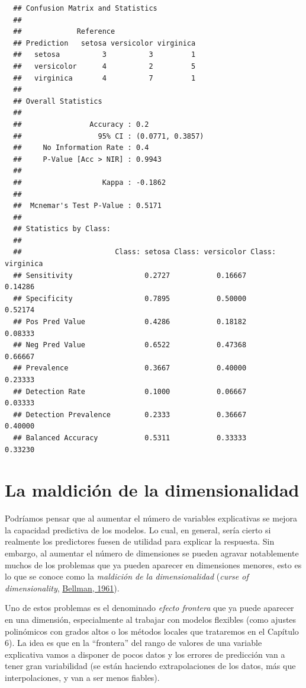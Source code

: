 \documentclass[
]{book}
\theoremstyle{break}
\theoremstyle{nonumberplain}
\begin{document}
\begin{verbatim}
  ## Confusion Matrix and Statistics
  ## 
  ##             Reference
  ## Prediction   setosa versicolor virginica
  ##   setosa          3          3         1
  ##   versicolor      4          2         5
  ##   virginica       4          7         1
  ## 
  ## Overall Statistics
  ##                                           
  ##                Accuracy : 0.2             
  ##                  95% CI : (0.0771, 0.3857)
  ##     No Information Rate : 0.4             
  ##     P-Value [Acc > NIR] : 0.9943          
  ##                                           
  ##                   Kappa : -0.1862         
  ##                                           
  ##  Mcnemar's Test P-Value : 0.5171          
  ## 
  ## Statistics by Class:
  ## 
  ##                      Class: setosa Class: versicolor Class: virginica
  ## Sensitivity                 0.2727           0.16667          0.14286
  ## Specificity                 0.7895           0.50000          0.52174
  ## Pos Pred Value              0.4286           0.18182          0.08333
  ## Neg Pred Value              0.6522           0.47368          0.66667
  ## Prevalence                  0.3667           0.40000          0.23333
  ## Detection Rate              0.1000           0.06667          0.03333
  ## Detection Prevalence        0.2333           0.36667          0.40000
  ## Balanced Accuracy           0.5311           0.33333          0.33230
\end{verbatim}

\hypertarget{dimen-curse}{%
\section{La maldición de la dimensionalidad}\label{dimen-curse}}

Podríamos pensar que al aumentar el número de variables explicativas se mejora la capacidad predictiva de los modelos.
Lo cual, en general, sería cierto si realmente los predictores fuesen de utilidad para explicar la respuesta.
Sin embargo, al aumentar el número de dimensiones se pueden agravar notablemente muchos de los problemas que ya pueden aparecer en dimensiones menores, esto es lo que se conoce como la \emph{maldición de la dimensionalidad} (\emph{curse of dimensionality}, \protect\hyperlink{ref-bellman1961adaptive}{Bellman, 1961}).

Uno de estos problemas es el denominado \emph{efecto frontera} que ya puede aparecer en una dimensión, especialmente al trabajar con modelos flexibles (como ajustes polinómicos con grados altos o los métodos locales que trataremos en el Capítulo 6).
La idea es que en la ``frontera'' del rango de valores de una variable explicativa vamos a disponer de pocos datos y los errores de predicción van a tener gran variabilidad (se están haciendo extrapolaciones de los datos, más que interpolaciones, y van a ser menos fiables).
\end{document}
